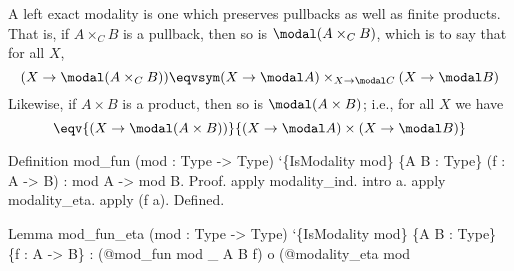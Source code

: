  \soln
A left exact modality is one which preserves pullbacks as well as finite
products.  That is, if $A \times _{C} B$ is a pullback, then so is
$\modal (A \times_{C} B)$, which is to say that for all $X$,
\[
  (X \to \modal(A \times_{C} B))
  \eqvsym
  (X \to \modal A) \times_{X \to \modal C} (X \to \modal B)
\]
Likewise, if $A \times B$ is a product, then so is $\modal(A \times B)$;
i.e., for all $X$ we have
\[
  \eqv{
    (X \to \modal(A \times B)) 
  }{
    (X \to \modal A) \times (X \to \modal B)
  }
\] \begin{coqdoccode}
\coqdocemptyline
\coqdocnoindent
\begin{coqdoccomment}
\coqdoceol
Definition\coqdocindent{0.50em}
mod\_fun\coqdocindent{0.50em}
(mod\coqdocindent{0.50em}
:\coqdocindent{0.50em}
Type\coqdocindent{0.50em}
->\coqdocindent{0.50em}
Type)\coqdocindent{0.50em}
`\{IsModality\coqdocindent{0.50em}
mod\}\coqdoceol
\coqdocindent{5.50em}
\{A\coqdocindent{0.50em}
B\coqdocindent{0.50em}
:\coqdocindent{0.50em}
Type\}\coqdocindent{0.50em}
(f\coqdocindent{0.50em}
:\coqdocindent{0.50em}
A\coqdocindent{0.50em}
->\coqdocindent{0.50em}
B)\coqdocindent{0.50em}
\coqdoceol
\coqdocindent{1.00em}
:\coqdocindent{0.50em}
mod\coqdocindent{0.50em}
A\coqdocindent{0.50em}
->\coqdocindent{0.50em}
mod\coqdocindent{0.50em}
B.\coqdoceol
Proof.\coqdoceol
\coqdocindent{1.00em}
apply\coqdocindent{0.50em}
modality\_ind.\coqdoceol
\coqdocindent{1.00em}
intro\coqdocindent{0.50em}
a.\coqdoceol
\coqdocindent{1.00em}
apply\coqdocindent{0.50em}
modality\_eta.\coqdoceol
\coqdocindent{1.00em}
apply\coqdocindent{0.50em}
(f\coqdocindent{0.50em}
a).\coqdoceol
Defined.\coqdoceol
\end{coqdoccomment}
\coqdoceol
\coqdocemptyline
\coqdocnoindent
\begin{coqdoccomment}
\coqdoceol
Lemma\coqdocindent{0.50em}
mod\_fun\_eta\coqdocindent{0.50em}
(mod\coqdocindent{0.50em}
:\coqdocindent{0.50em}
Type\coqdocindent{0.50em}
->\coqdocindent{0.50em}
Type)\coqdocindent{0.50em}
`\{IsModality\coqdocindent{0.50em}
mod\}\coqdocindent{0.50em}
\{A\coqdocindent{0.50em}
B\coqdocindent{0.50em}
:\coqdocindent{0.50em}
Type\}\coqdocindent{0.50em}
\coqdoceol
\coqdocindent{3.00em}
\{f\coqdocindent{0.50em}
:\coqdocindent{0.50em}
A\coqdocindent{0.50em}
->\coqdocindent{0.50em}
B\}\coqdocindent{0.50em}
:\coqdoceol
\coqdocindent{1.00em}
(@mod\_fun\coqdocindent{0.50em}
mod\coqdocindent{0.50em}
\_\coqdocindent{0.50em}
A\coqdocindent{0.50em}
B\coqdocindent{0.50em}
f)\coqdocindent{0.50em}
o\coqdocindent{0.50em}
(@modality\_eta\coqdocindent{0.50em}
mod\coqdocindent{0.50em}

\end{coqdoccomment}
\end{coqdoccode}
